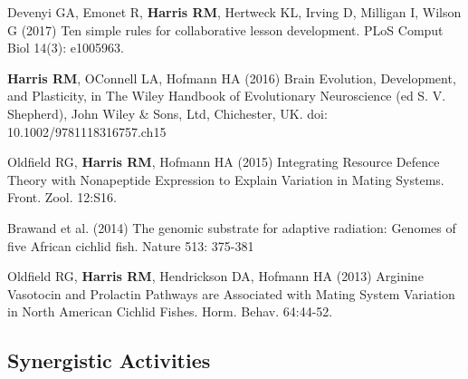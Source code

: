 \documentclass[svgnames,11pt]{article}
\begin{document}
\begin{bibenum}[itemsep=5pt]

\item Devenyi GA, Emonet R, {\bf Harris RM}, Hertweck KL, Irving D, Milligan I, Wilson G (2017) Ten simple rules for collaborative lesson development. PLoS Comput Biol 14(3): e1005963.

\item {\bf Harris RM}, O\textsc{}Connell LA, Hofmann HA (2016) Brain Evolution, Development, and Plasticity, in The Wiley Handbook of Evolutionary Neuroscience (ed S. V. Shepherd), John Wiley \& Sons, Ltd, Chichester, UK. doi: 10.1002/9781118316757.ch15

\item Oldfield RG, {\bf Harris RM}, Hofmann HA (2015) Integrating Resource Defence Theory with Nonapeptide Expression to Explain Variation in Mating Systems. Front. Zool. 12:S16. 

\item Brawand et al. (2014) The genomic substrate for adaptive radiation: Genomes of five African cichlid fish. Nature 513: 375-381

\item Oldfield RG, {\bf Harris RM}, Hendrickson DA, Hofmann HA (2013) Arginine Vasotocin and Prolactin Pathways are Associated with Mating System Variation in North American Cichlid Fishes. Horm. Behav. 64:44-52. 


\end{bibenum}



\subsection{Synergistic Activities}
\end{document}

